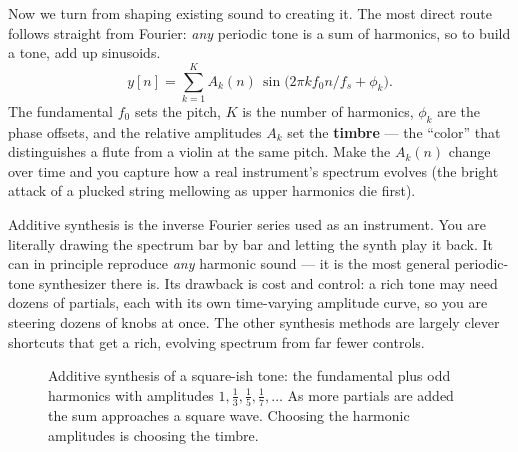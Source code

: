 Now we turn from shaping existing sound to creating it. The most direct route
follows straight from Fourier: \emph{any} periodic tone is a sum of harmonics, so
to build a tone, add up sinusoids.
\begin{equation}
\label{ch28:additive-eq}
y[n]=\sum_{k=1}^{K} A_k(n)\,\sin\!\bigl(2\pi k f_0 n/f_s + \phi_k\bigr).
\end{equation}
The fundamental $f_0$ sets the pitch, $K$ is the number of harmonics, $\phi_k$ are the phase offsets, and the relative amplitudes $A_k$ set the
\textbf{timbre} --- the ``color'' that distinguishes a flute from a violin at the
same pitch. Make the $A_k(n)$ change over time and you capture how a real
instrument's spectrum evolves (the bright attack of a plucked string mellowing
as upper harmonics die first).

\begin{intuitionbox}
Additive synthesis is the inverse Fourier series used as an instrument. You are
literally drawing the spectrum bar by bar and letting the synth play it back. It
can in principle reproduce \emph{any} harmonic sound --- it is the most general
periodic-tone synthesizer there is. Its drawback is cost and control: a rich tone
may need dozens of partials, each with its own time-varying amplitude curve, so
you are steering dozens of knobs at once. The other synthesis methods are largely
clever shortcuts that get a rich, evolving spectrum from far fewer controls.
\end{intuitionbox}

\begin{figure}[H]
\centering
{}
\caption{Additive synthesis of a square-ish tone: the fundamental plus odd
harmonics with amplitudes $1,\tfrac13,\tfrac15,\tfrac17,\dots$ As more partials
are added the sum approaches a square wave. Choosing the harmonic amplitudes is
choosing the timbre.}
\label{ch28:fig-additive}
\end{figure}

